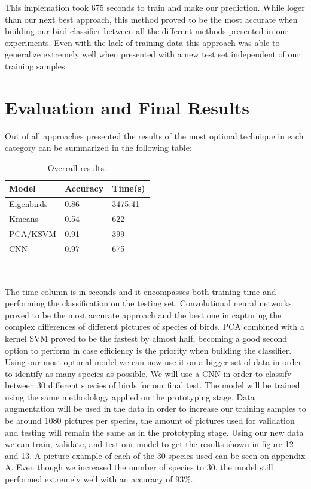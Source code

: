 \documentclass[11pt]{article}
\begin{document}
\begin{singlespace}
This implemation took 675 seconds to train and make our prediction. While loger than our next best approach, this method proved to be the most accurate when building our bird classifier between all the different methods presented in our experiments. Even with the lack of training data this approach was able to generalize extremely well when presented with a new test set independent of our training samples. \\

\section{Evaluation and Final Results}

Out of all approaches presented the results of the most optimal technique in each category can be summarized in the following table:

\begin{table}[h]
    \centering
    \begin{tabular}{ |M{2.5cm}|M{2cm}|M{2cm}|}
	 \hline
	 Model & Accuracy&Time(s)\\
	 \hline
	 Eigenbirds & 0.86 &  3475.41  \\
	 Kmeans & 0.54 & 622 \\
	 PCA/KSVM & 0.91 & 399 \\
	 CNN & 0.97 & 675 \\
	 \hline
   \end{tabular} \\
   \caption{Overrall results.}
\end{table}

The time column is in seconds and it encompasses both training time and performing the classification on the testing set. Convolutional neural networks proved to be the most accurate approach and the best one in capturing the complex differences of different pictures of species of birds. PCA combined with a kernel SVM proved to be the fastest by almost half, becoming a good second option to perform in case efficiency is the priority when building the classifier. \\



Using our most optimal model we can now use it on a bigger set of data in order to identify as many species as possible. We will use a CNN in order to classify between 30 different species of birds for our final test. The model will be trained using the same methodology applied on the prototyping stage. Data augmentation will be used in the data in order to increase our training samples to be around 1080 pictures per species, the amount of pictures used for validation and testing will remain the same as in the prototyping stage. Using our new data we can train, validate, and test our model to get the results shown in figure 12 and 13. A picture example of each of the 30 species used can be seen on appendix A. Even though we increased the number of species to 30, the model still performed extremely well with an accuracy of 93\%. \\


\end{singlespace}
\end{document}
